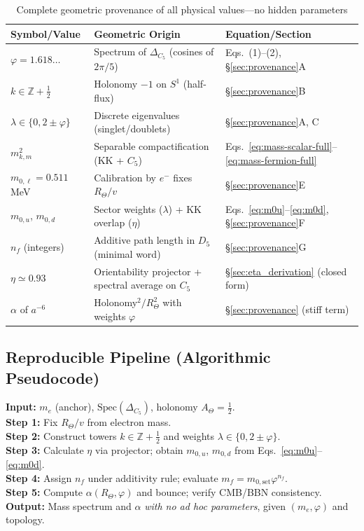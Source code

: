 \documentclass[12pt]{article}
\theoremstyle{definition}
\theoremstyle{plain}
\begin{document}
\begin{table}[H]
\centering
\small
\caption{Complete geometric provenance of all physical values—no hidden parameters}
\label{tab:provenance}
\begin{tabular}{>{\raggedright}p{2.8cm} >{\raggedright\arraybackslash}p{5.4cm} >{\raggedright\arraybackslash}p{5.4cm}}
\toprule
\textbf{Symbol/Value} & \textbf{Geometric Origin} & \textbf{Equation/Section} \\
\midrule
$\varphi = 1.618\ldots$ & Spectrum of $\Delta_{C_5}$ (cosines of $2\pi/5$) & Eqs.~(1)--(2), \S\ref{sec:provenance}A \\
$k \in \mathbb{Z} + \tfrac{1}{2}$ & Holonomy $-1$ on $S^1$ (half-flux) & \S\ref{sec:provenance}B \\
$\lambda \in \{0, 2 \pm \varphi\}$ & Discrete eigenvalues (singlet/doublets) & \S\ref{sec:provenance}A, C \\
$m^2_{k,m}$ & Separable compactification (KK + $C_5$) & Eqs.~\eqref{eq:mass-scalar-full}--\eqref{eq:mass-fermion-full} \\
$m_{0,\ell} = 0.511$ MeV & Calibration by $e^-$ fixes $R_\Theta / v$ & \S\ref{sec:provenance}E \\
$m_{0,u}$, $m_{0,d}$ & Sector weights ($\lambda$) + KK overlap ($\eta$) & Eqs.~\eqref{eq:m0u}--\eqref{eq:m0d}, \S\ref{sec:provenance}F \\
$n_f$ (integers) & Additive path length in $D_5$ (minimal word) & \S\ref{sec:provenance}G \\
$\eta \simeq 0.93$ & Orientability projector + spectral average on $C_5$ & \S\ref{sec:eta_derivation} (closed form) \\
$\alpha$ of $a^{-6}$ & Holonomy$^2 / R_\Theta^2$ with weights $\varphi$ & \S\ref{sec:provenance} (stiff term) \\
\bottomrule
\end{tabular}
\end{table}

\subsection{Reproducible Pipeline (Algorithmic Pseudocode)}

\noindent\textbf{Input:} $m_e$ (anchor), $\text{Spec}(\Delta_{C_5})$, holonomy $A_\Theta = \tfrac{1}{2}$. \\[4pt]
\textbf{Step 1:} Fix $R_\Theta / v$ from electron mass. \\
\textbf{Step 2:} Construct towers $k \in \mathbb{Z} + \tfrac{1}{2}$ and weights $\lambda \in \{0, 2 \pm \varphi\}$. \\
\textbf{Step 3:} Calculate $\eta$ via projector; obtain $m_{0,u}$, $m_{0,d}$ from Eqs.~\eqref{eq:m0u}--\eqref{eq:m0d}. \\
\textbf{Step 4:} Assign $n_f$ under additivity rule; evaluate $m_f = m_{0,\text{set}} \varphi^{n_f}$. \\
\textbf{Step 5:} Compute $\alpha(R_\Theta, \varphi)$ and bounce; verify CMB/BBN consistency. \\[4pt]
\textbf{Output:} Mass spectrum and $\alpha$ \textit{with no ad hoc parameters}, given $(m_e, \varphi)$ and topology.
\end{document}
